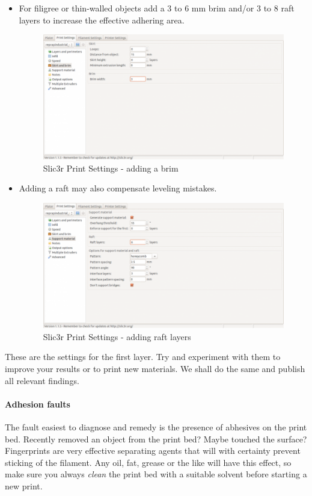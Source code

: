 \begin{itemize}
  \item For filigree or thin-walled objects add a 3 to 6 mm brim and/or 3 to 8 raft layers 
        to increase the effective adhering area. 

    \begin{figure}[H]
      \centering
      \includegraphics[width=.7\linewidth]{./img/slic3r_brim.png}
      \caption{Slic3r Print Settings - adding a brim}
    \end{figure}

  \item Adding a raft may also compensate leveling mistakes. 

    \begin{figure}[H]
      \centering
      \includegraphics[width=.7\linewidth]{./img/slic3r_raft.png}
      \caption{Slic3r Print Settings - adding raft layers}
    \end{figure}

\end{itemize}

These are the settings for the first layer. Try and experiment with them to improve your results or to print new materials. We shall do the same and publish all relevant findings.

\paragraph{Adhesion faults} 

The fault easiest to diagnose and remedy is the presence of abhesives on the print bed. Recently removed an object from the print bed? Maybe touched the surface? Fingerprints are very effective separating agents that will with certainty prevent sticking of the filament. Any oil, fat, grease or the like will have this effect, so make sure you always \emph{clean} the print bed with a suitable solvent before starting a new print.

